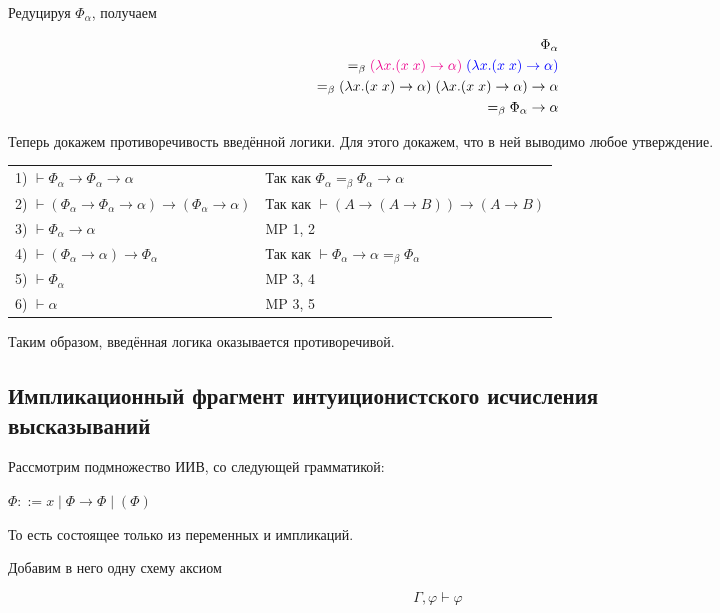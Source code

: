 Редуцируя $\Phi_{\alpha}$, получаем 

\begin{align*}
\Phi_{\alpha} \\ =_{\beta} \textcolor{magenta}{(\lambda x. (x \; x) \rightarrow \alpha)} \; \textcolor{blue}{(\lambda x. (x \; x) \rightarrow \alpha)} \\=_{\beta} (\lambda x. (x \; x) \rightarrow \alpha) \; (\lambda x. (x \; x) \rightarrow \alpha) \rightarrow \alpha \\=_{\beta} \Phi_{\alpha} \rightarrow \alpha
\end{align*}

Теперь докажем противоречивость введённой логики. Для этого докажем, что в ней выводимо любое утверждение.

\begin{tabular}{ll}
	1) $\vdash\Phi_\alpha\rightarrow\Phi_\alpha\rightarrow\alpha$ & Так как $\Phi_{\alpha} =_{\beta} \Phi_{\alpha} \rightarrow \alpha$\\
	2) $\vdash(\Phi_\alpha\rightarrow\Phi_\alpha\rightarrow\alpha)\rightarrow(\Phi_\alpha\rightarrow\alpha)$ & Так как $\vdash (A \rightarrow (A \rightarrow B)) \rightarrow (A \rightarrow B)$\\
	3) $\vdash\Phi_\alpha\rightarrow\alpha$ & MP 1, 2\\
	4) $\vdash (\Phi_\alpha \rightarrow \alpha) \rightarrow \Phi_\alpha$ & Так как $\vdash \Phi_\alpha \rightarrow \alpha =_{\beta} \Phi_\alpha$\\
	5) $\vdash\Phi_\alpha$ & MP 3, 4\\
	6) $\vdash\alpha$ & MP 3, 5
\end{tabular}

Таким образом, введённая логика оказывается противоречивой.

\subsection{Импликационный фрагмент интуиционистского исчисления \\высказываний}

Рассмотрим подмножество ИИВ, со следующей грамматикой:

$\Phi ::= x \; | \; \Phi \rightarrow \Phi \; | \; (\Phi)$

То есть состоящее только из переменных и импликаций. 

Добавим в него одну схему аксиом

$$\Gamma, \varphi \vdash \varphi$$

